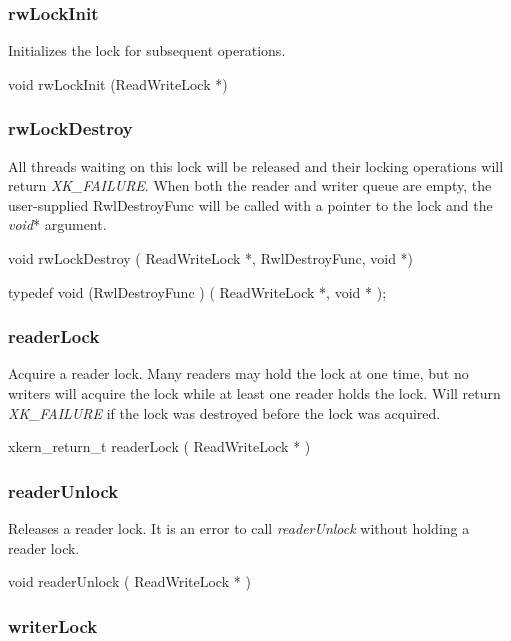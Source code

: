 \subsubsection{rwLockInit}

Initializes the lock for subsequent operations.  

\medskip
{\sem void} {\bold rwLockInit} ({\sem ReadWriteLock} *)


\subsubsection{rwLockDestroy}

All threads waiting on this lock will be released and their locking
operations will return {\em XK\_FAILURE}.  When both the reader and writer
queue are empty, the user-supplied {RwlDestroyFunc} will be called
with a pointer to the lock and the {\em void}* argument.

\medskip

{\sem void} {\bold rwLockDestroy} 
( {\sem ReadWriteLock} *, {\sem RwlDestroyFunc}, {\sem void} *)

\medskip
{\sem typedef void} ({\bold *RwlDestroyFunc} )
( {\sem ReadWriteLock} *, {\sem void} * );


\subsubsection{readerLock}

Acquire a reader lock.  Many readers may hold the lock at one time,
but no writers will acquire the lock while at least one reader holds
the lock.  Will return {\em XK\_FAILURE} if the lock was destroyed before
the lock was acquired.

\medskip
{\sem xkern\_return\_t} {\bold readerLock} ( {\sem ReadWriteLock} * )


\subsubsection{readerUnlock}

Releases a reader lock.  It is an error to call {\em readerUnlock}
without holding a reader lock.

\medskip
{\sem void} {\bold readerUnlock} ( {\sem ReadWriteLock} * )


\subsubsection{writerLock}

